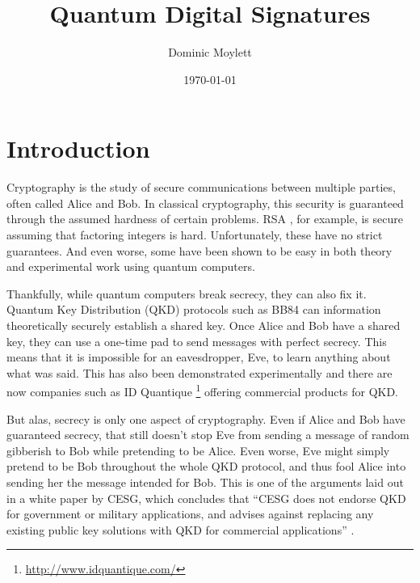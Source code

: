 \documentclass[%
 reprint,
 amsmath,amssymb,
 aps,
 pra,
]{revtex4-1}
\begin{document}
\title{Quantum Digital Signatures}

\author{Dominic Moylett}
%

\date{\today}%

\maketitle


\section{Introduction}
\label{sec:intro}

Cryptography is the study of secure communications between multiple parties, often called Alice and Bob. In classical cryptography, this security is guaranteed through the assumed hardness of certain problems. RSA \cite{Rivest:1978:MOD:359340.359342}, for example, is secure assuming that factoring integers is hard. Unfortunately, these have no strict guarantees. And even worse, some have been shown to be easy in both theory \cite{Shor97} and experimental work \cite{MLL+12, 1604.05796} using quantum computers.

Thankfully, while quantum computers break secrecy, they can also fix it. Quantum Key Distribution (QKD) protocols such as BB84 \citep{BB84} can information theoretically securely establish a shared key. Once Alice and Bob have a shared key, they can use a one-time pad to send messages with perfect secrecy. This means that it is impossible for an eavesdropper, Eve, to learn anything about what was said. This has also been demonstrated experimentally \cite{Bennett1992} and there are now companies such as ID Quantique \footnote{\url{http://www.idquantique.com/}} offering commercial products for QKD.

But alas, secrecy is only one aspect of cryptography. Even if Alice and Bob have guaranteed secrecy, that still doesn't stop Eve from sending a message of random gibberish to Bob while pretending to be Alice. Even worse, Eve might simply pretend to be Bob throughout the whole QKD protocol, and thus fool Alice into sending her the message intended for Bob. This is one of the arguments laid out in a white paper by CESG, which concludes that ``CESG does not endorse QKD for government or military applications, and advises against replacing any existing public key solutions with QKD for commercial applications'' \cite{CESG16}.
\end{document}
